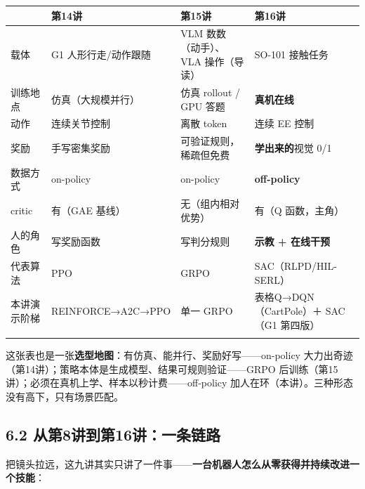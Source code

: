 \documentclass[
  chinese,
]{ctexart}
\begin{document}
\begin{center}
\begin{tabular}{@{}>{\raggedright\arraybackslash}p{} >{\raggedright\arraybackslash}p{} >{\raggedright\arraybackslash}p{} >{\raggedright\arraybackslash}p{}@{}}
\toprule\noalign{}
 & 第14讲 & 第15讲 & 第16讲 \\
\midrule\noalign{}
载体 & G1 人形行走/动作跟随 & VLM 数数（动手）、VLA 操作（导读） & SO-101 接触任务 \\
训练地点 & 仿真（大规模并行） & 仿真 rollout / GPU 答题 & \textbf{真机在线} \\
动作 & 连续关节控制 & 离散 token & 连续 EE 控制 \\
奖励 & 手写密集奖励 & 可验证规则，稀疏但免费 & \textbf{学出来的}视觉 0/1 \\
数据方式 & on-policy & on-policy & \textbf{off-policy} \\
critic & 有（GAE 基线） & 无（组内相对优势） & 有（Q 函数，主角） \\
人的角色 & 写奖励函数 & 写判分规则 & \textbf{示教 + 在线干预} \\
代表算法 & PPO & GRPO & SAC（RLPD/HIL-SERL） \\
本讲演示阶梯 & REINFORCE→A2C→PPO & 单一 GRPO & 表格Q→DQN（CartPole）＋ SAC（G1 第四版） \\
\bottomrule\noalign{}
\end{tabular}
\end{center}

这张表也是一张\textbf{选型地图}：有仿真、能并行、奖励好写------on-policy
大力出奇迹（第14讲）；策略本体是生成模型、结果可规则验证------GRPO
后训练（第15讲）；必须在真机上学、样本以秒计费------off-policy
加人在环（本讲）。三种形态没有高下，只有场景匹配。

\subsection{6.2
从第8讲到第16讲：一条链路}\label{ux4eceux7b2c8ux8bb2ux5230ux7b2c16ux8bb2ux4e00ux6761ux94feux8def}

把镜头拉远，这九讲其实只讲了一件事------\textbf{一台机器人怎么从零获得并持续改进一个技能}：
\end{document}
